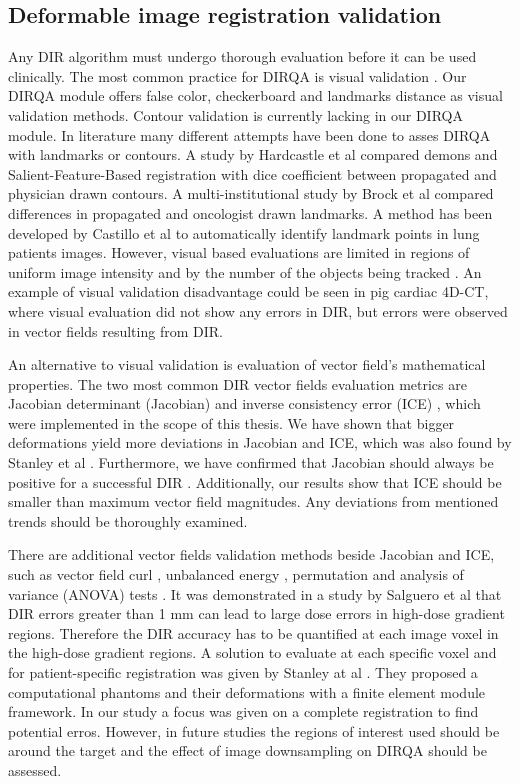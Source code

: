 \subsection{Deformable image registration validation}

Any DIR algorithm must undergo thorough evaluation before it can be used clinically. The most common practice for DIRQA is visual validation \cite{Stanley2013}. 
Our DIRQA module offers false color, checkerboard and landmarks distance as
visual validation methods. Contour validation is currently lacking in our DIRQA module. In literature many different attempts have been done to asses DIRQA with landmarks or contours. 
A study by Hardcastle et al \cite{Hardcastle2012} 
compared demons and Salient-Feature-Based registration with dice coefficient between propagated and physician drawn contours.
A multi-institutional study by Brock et al \cite{Brock2010} compared differences in propagated and oncologist drawn landmarks. 
A method has been developed by Castillo et al \cite{Castillo2009} to automatically identify landmark points
in lung patients images. However, visual based evaluations are limited in regions of uniform image intensity and by the number of the objects being tracked \cite{Kashani2008, Liu2012}. 
An example of visual validation disadvantage could be seen in
pig cardiac 4D-CT, where visual evaluation did not show any errors in DIR, but errors were observed in vector fields resulting from DIR.

An alternative to visual validation is evaluation of vector field's mathematical properties. The two most common DIR vector fields evaluation metrics are 
Jacobian determinant (Jacobian) and inverse consistency error (ICE) \cite{Leow2007, Christensen2001}, which were implemented in the scope of this thesis. 
We have shown that bigger deformations yield more deviations in Jacobian and ICE, which was also found by Stanley et al \cite{Stanley2013}. 
Furthermore, we have confirmed that Jacobian should always be positive for a successful DIR \cite{Rey2002}. Additionally, our results show that ICE should 
be smaller than maximum vector field magnitudes. Any deviations from mentioned trends should be thoroughly examined.

There are additional vector fields validation methods beside Jacobian and ICE, such as vector field curl \cite{Schreibmann2012}, unbalanced energy \cite{Zhong2007}, 
permutation and analysis of variance (ANOVA) tests \cite{Klein2009}.
It was demonstrated in a study by Salguero et al \cite{Salguero2011} that DIR errors greater than 1 mm can lead to large dose errors in high-dose gradient regions. 
Therefore the DIR accuracy has to be quantified at each image voxel in the high-dose 
gradient regions. A solution to evaluate at each specific voxel and for patient-specific registration was given by Stanley at al \cite{Stanley2013}. 
They proposed a computational phantoms and their deformations with a finite element module framework. 
In our study a focus was given on a complete registration to find potential erros. However, in future studies the regions of interest used
should be around the target and the effect of image downsampling on DIRQA should be assessed.




